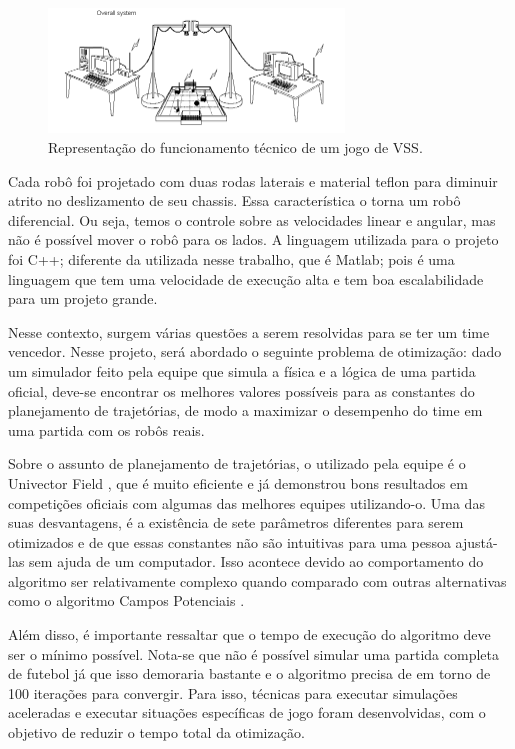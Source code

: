 \documentclass[a4paper,12pt]{article}
\begin{document}
\begin{figure}[H]
	\centering
		\includegraphics[width=0.7\textwidth]{figures/overview.png}
  \caption{Representação do funcionamento técnico de um jogo de VSS.}
	\label{fig:funcioamento}
\end{figure}

Cada robô foi projetado com duas rodas laterais e material teflon para diminuir atrito no deslizamento de seu chassis. Essa característica o torna um robô diferencial. Ou seja, temos o controle sobre as velocidades linear e angular, mas não é possível mover o robô para os lados. A linguagem utilizada para o projeto foi C++; diferente da utilizada nesse trabalho, que é Matlab; pois é uma linguagem que tem uma velocidade de execução alta e tem boa escalabilidade para um projeto grande. 

Nesse contexto, surgem várias questões a serem resolvidas para se ter um time vencedor. Nesse projeto, será abordado o seguinte problema de otimização: dado um simulador feito pela equipe que simula a física e a lógica de uma partida oficial, deve-se encontrar os melhores valores possíveis para as constantes do planejamento de trajetórias, de modo a maximizar o desempenho do time em uma partida com os robôs reais.

Sobre o assunto de planejamento de trajetórias, o utilizado pela equipe é o Univector Field \cite{univector}, que é muito eficiente e já demonstrou bons resultados em competições oficiais com algumas das melhores equipes utilizando-o. Uma das suas desvantagens, é a existência de sete parâmetros diferentes para serem otimizados e de que essas constantes não são intuitivas para uma pessoa ajustá-las sem ajuda de um computador. Isso acontece devido ao comportamento do algoritmo ser relativamente complexo quando comparado com outras alternativas como o algoritmo Campos Potenciais \cite{potential_fields}.

Além disso, é importante ressaltar que o tempo de execução do algoritmo deve ser o mínimo possível. Nota-se que não é possível simular uma partida completa de futebol já que isso demoraria bastante e o algoritmo precisa de em torno de 100 iterações para convergir. Para isso, técnicas para executar simulações aceleradas e executar situações específicas de jogo foram desenvolvidas, com o objetivo de reduzir o tempo total da otimização.
\end{document}
